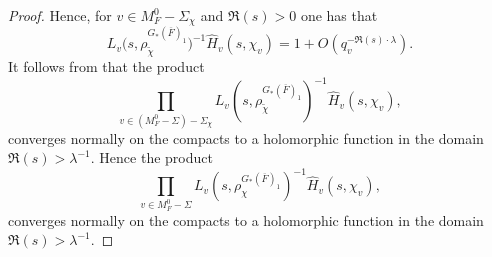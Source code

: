 \documentclass[a4paper,english,12pt]{amsart}
\newcommand{\CC}{\mathbb{C}}
\newcommand{\oF}{\overline F}
\newcommand{\wH}{\widehat H}
\newcommand{\wchi}{\widetilde{\chi}}
\DeclareMathOperator{\Tr}{tr}
\DeclareMathOperator{\Frob}{Frob}
\numberwithin{equation}{subsection}
\begin{document}
\begin{proof}
Hence, for $v\in M_F^0-\Sigma_\chi$ and $\Re(s)>0$ one has that $$L_v\big(s,\rho_{\widetilde\chi}^{G_*(\oF)_1}\big)^{-1}\wH_v(s,\chi_v)=1+O(q_v^{-\Re(s)\cdot \lambda}).$$ It follows from \cite[Chapter VII, \S 5, Corollary 1]{basicnt} that the product $$\prod_{v\in (M_F^0-\Sigma)-\Sigma_\chi}L_v(s,\rho_{\wchi}^{G_*(\oF)_1})^{-1}\wH_v(s,\chi_v),$$ %
converges normally on the compacts to a holomorphic function in the domain $\Re(s)>\lambda^{-1}.$ 
Hence the product $$\prod_{v\in M_F^0-\Sigma}L_v(s,\rho_{\chi}^{G_*(\oF)_1})^{-1}\wH_v(s,\chi_v),$$ converges normally on the compacts to a holomorphic function in the domain $\Re(s)>\lambda^{-1}.$ 
\end{proof}
\end{document}

